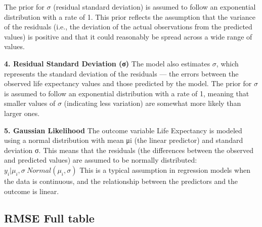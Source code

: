 \documentclass[
  letterpaper,
  DIV=11,
  numbers=noendperiod]{scrartcl}
\begin{document}
The prior for \(σ\) (residual standard deviation) is assumed to follow
an exponential distribution with a rate of 1. This prior reflects the
assumption that the variance of the residuals (i.e., the deviation of
the actual observations from the predicted values) is positive and that
it could reasonably be spread across a wide range of values.

\textbf{4. Residual Standard Deviation (σ)} The model also estimates
\(σ\), which represents the standard deviation of the residuals --- the
errors between the observed life expectancy values and those predicted
by the model. The prior for \(σ\) is assumed to follow an exponential
distribution with a rate of 1, meaning that smaller values of \(σ\)
(indicating less variation) are somewhat more likely than larger ones.

\textbf{5. Gaussian Likelihood} The outcome variable Life Expectancy is
modeled using a normal distribution with mean μi (the linear predictor)
and standard deviation σ. This means that the residuals (the differences
between the observed and predicted values) are assumed to be normally
distributed: \(y_i| \mu_i, \sigma ~ Normal(\mu_i, \sigma)\) This is a
typical assumption in regression models when the data is continuous, and
the relationship between the predictors and the outcome is linear.

\subsection{RMSE Full table}\label{rmse-full-table}
\end{document}
